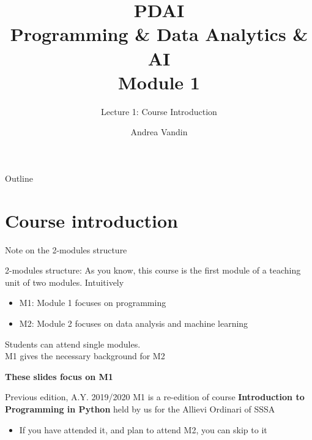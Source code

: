 \documentclass{beamer}%
\title{PDAI\\ Programming \& Data Analytics \& AI \\ Module 1
}
\subtitle{Lecture 1: Course Introduction}
\date{%
}
\begin{document}
\frame{\titlepage}
\author{Andrea Vandin}


\begin{frame}{Outline}
\tableofcontents
\end{frame}

\section{Course introduction}

\begin{frame}{Note on the 2-modules structure}
	\begin{block}{2-modules structure: \myurl{\homepage}}
		As you know, this course is the first module of a teaching unit of two modules. Intuitively
		\begin{itemize}
			\item M1: Module 1 focuses on programming
			\item M2: Module 2 focuses  on data analysis and machine learning
		\end{itemize}
		Students can attend single modules. \\ M1 gives the necessary background for M2
		\begin{center}\textbf{These slides focus on M1}\end{center}
	\end{block}	
\pause
	\begin{block}{Previous edition, A.Y. 2019/2020}
		M1 is a re-edition of course \textbf{Introduction to Programming in Python} held by us 
		for the Allievi Ordinari of SSSA
		\begin{itemize}
			\item If you have attended it, and plan to attend M2, you can skip to it
		\end{itemize}
	\end{block}
\end{frame}
\end{document}
